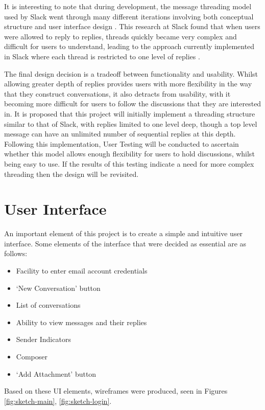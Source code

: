 It is interesting to note that during development, the message threading model used by Slack went through many different iterations involving both conceptual structure and user interface design \cite{florin2018}. This research at Slack found that when users were allowed to reply to replies, threads quickly became very complex and difficult for users to understand, leading to the approach currently implemented in Slack where each thread is restricted to one level of replies \cite{florin2018}.

The final design decision is a tradeoff between functionality and usability. Whilst allowing greater depth of replies provides users with more flexibility in the way that they construct conversations, it also detracts from usability, with it becoming more difficult for users to follow the discussions that they are interested in. It is proposed that this project will initially implement a threading structure similar to that of Slack, with replies limited to one level deep, though a top level message can have an unlimited number of sequential replies at this depth. Following this implementation, User Testing will be conducted to ascertain whether this model allows enough flexibility for users to hold discussions, whilst being easy to use. If the results of this testing indicate a need for more complex threading then the design will be revisited.

\section{User Interface}

An important element of this project is to create a simple and intuitive user interface. Some elements of the interface that were decided as essential are as follows:
\begin{itemize}
  \item Facility to enter email account credentials
  \item `New Conversation' button
  \item List of conversations
  \item Ability to view messages and their replies
  \item Sender Indicators
  \item Composer
  \item `Add Attachment' button
\end{itemize}

Based on these UI elements, wireframes were produced, seen in Figures \ref{fig:sketch-main}, \ref{fig:sketch-login}.

